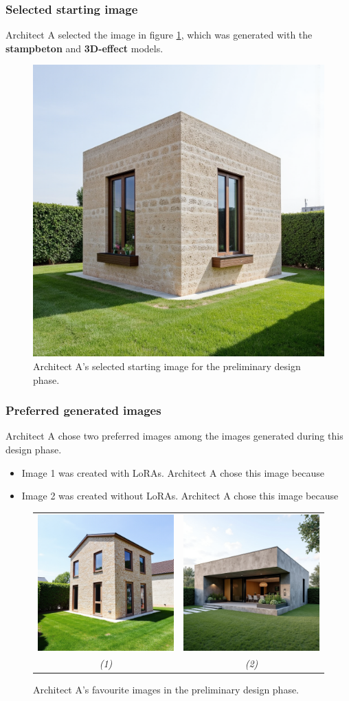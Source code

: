 \subsubsection{Selected starting image}
Architect A selected the image in figure \ref{fig:A-preliminary-selected}, which was generated with the \textbf{stampbeton} and \textbf{3D-effect} models. 
\begin{figure}[H]
    \centering
    \includegraphics[width=0.3\linewidth]{Images/Results/Architect-A_Fixed-images/2-preliminary_design/Met_lora_00080_.png}
    \caption{Architect A's selected starting image for the preliminary design phase.}
    \label{fig:A-preliminary-selected}
\end{figure}
\subsubsection{Preferred generated images}
Architect A chose two preferred images among the images generated during this design phase. 
\begin{itemize}
    \item Image 1 was created with LoRAs. Architect A chose this image because
    \item Image 2 was created without LoRAs. Architect A chose this image because 
\end{itemize}
\begin{figure}[H]
    \centering
    \begin{tabular}{cc}
         \includegraphics[width=0.3\linewidth]{Images/Results/Architect A/2. Preliminary phase/Met_lora_00004_.png} & \includegraphics[width=0.3\linewidth]{Images/Results/Architect A/2. Preliminary phase/Zonder_lora_00146_.png}\\
         \textit{(1)} & \textit{(2)}
    \end{tabular}
    \caption{Architect A's favourite images in the preliminary design phase.}
    \label{fig:A-preliminary-preferred}
\end{figure}

